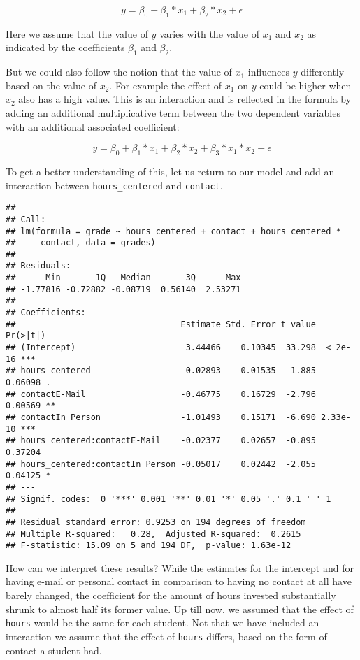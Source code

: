 \documentclass[
]{book}
\begin{document}
\[y = \beta_0 + \beta_1*x_1 + \beta_2*x_2 + \epsilon\]

Here we assume that the value of \(y\) varies with the value of \(x_1\) and \(x_2\) as
indicated by the coefficients \(\beta_1\) and \(\beta_2\).

But we could also follow the notion that the value of \(x_1\) influences \(y\)
differently based on the value of \(x_2\). For example the effect of \(x_1\) on \(y\)
could be higher when \(x_2\) also has a high value. This is an interaction and is
reflected in the formula by adding an additional multiplicative term between
the two dependent variables with an additional associated coefficient:

\[y = \beta_0 + \beta_1*x_1 + \beta_2*x_2 + \beta_3 * x_1 * x_2 + \epsilon\]

To get a better understanding of this, let us return to our model and add an
interaction between \texttt{hours\_centered} and \texttt{contact}.

\begin{verbatim}
## 
## Call:
## lm(formula = grade ~ hours_centered + contact + hours_centered * 
##     contact, data = grades)
## 
## Residuals:
##      Min       1Q   Median       3Q      Max 
## -1.77816 -0.72882 -0.08719  0.56140  2.53271 
## 
## Coefficients:
##                                 Estimate Std. Error t value Pr(>|t|)    
## (Intercept)                      3.44466    0.10345  33.298  < 2e-16 ***
## hours_centered                  -0.02893    0.01535  -1.885  0.06098 .  
## contactE-Mail                   -0.46775    0.16729  -2.796  0.00569 ** 
## contactIn Person                -1.01493    0.15171  -6.690 2.33e-10 ***
## hours_centered:contactE-Mail    -0.02377    0.02657  -0.895  0.37204    
## hours_centered:contactIn Person -0.05017    0.02442  -2.055  0.04125 *  
## ---
## Signif. codes:  0 '***' 0.001 '**' 0.01 '*' 0.05 '.' 0.1 ' ' 1
## 
## Residual standard error: 0.9253 on 194 degrees of freedom
## Multiple R-squared:   0.28,  Adjusted R-squared:  0.2615 
## F-statistic: 15.09 on 5 and 194 DF,  p-value: 1.63e-12
\end{verbatim}

How can we interpret these results?
While the estimates for the intercept and for having e-mail or personal contact
in comparison to having no contact at all have barely changed, the coefficient
for the amount of hours invested substantially shrunk to almost half its former
value. Up till now, we assumed that the effect of \texttt{hours} would be the same for
each student. Not that we have included an interaction we assume that the effect
of \texttt{hours} differs, based on the form of contact a student had.
\end{document}
